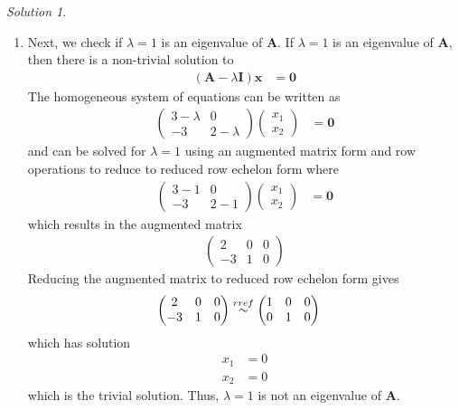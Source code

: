 \documentclass[
]{book}
\providecommand{\tightlist}{%
  \setlength{\itemsep}{0pt}\setlength{\parskip}{0pt}}
\theoremstyle{definition}
\theoremstyle{definition}
\theoremstyle{definition}
\theoremstyle{definition}
\theoremstyle{remark}
\newtheorem*{solution}{Solution}
\begin{document}
\begin{solution}
\begin{enumerate}
\def\labelenumi{\alph{enumi})}
\setcounter{enumi}{1}
\tightlist
\item
  Next, we check if \(\lambda = 1\) is an eigenvalue of \(\mathbf{A}\). If \(\lambda = 1\) is an eigenvalue of \(\mathbf{A}\), then there is a non-trivial solution to
  \[
  \begin{aligned}
  \left( \mathbf{A} - \lambda\mathbf{I} \right) \mathbf{x} & = \mathbf{0}
  \end{aligned}
  \]
  The homogeneous system of equations can be written as
  \[
  \begin{aligned}
  \begin{pmatrix} 
  3  - \lambda & 0 \\
  -3 & 2 - \lambda 
  \end{pmatrix} \begin{pmatrix} x_1 \\ x_2 \end{pmatrix} & = \mathbf{0}
  \end{aligned}
  \]
  and can be solved for \(\lambda = 1\) using an augmented matrix form and row operations to reduce to reduced row echelon form where
  \[
  \begin{aligned}
  \begin{pmatrix} 
  3  - 1 & 0 \\
  -3 & 2 - 1
  \end{pmatrix} \begin{pmatrix} x_1 \\ x_2 \end{pmatrix} & = \mathbf{0}
  \end{aligned}
  \]
  which results in the augmented matrix
  \[
  \begin{aligned}
  \begin{pmatrix} 2 & 0 & 0 \\ -3 & 1 & 0 \end{pmatrix}
  \end{aligned}
  \]
  Reducing the augmented matrix to reduced row echelon form gives
  \[
  \begin{aligned}
  \begin{pmatrix} 2 & 0 & 0 \\ -3 & 1 & 0 \end{pmatrix} & \stackrel{rref}{\huge \sim} \begin{pmatrix} 1 & 0 & 0 \\ 0 & 1 & 0 \end{pmatrix}
  \end{aligned}
  \]
  which has solution
  \[
  \begin{aligned}
  x_1  & = 0 \\
  x_2  & = 0 
  \end{aligned}
  \]
  which is the trivial solution. Thus, \(\lambda = 1\) is not an eigenvalue of \(\mathbf{A}\).
\end{enumerate}


\end{solution}
\end{document}
